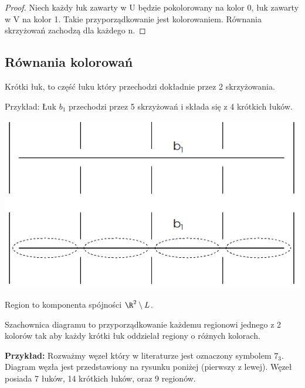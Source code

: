 \begin{proof}
Niech każdy łuk zawarty w U będzie pokolorowany na kolor 0, łuk zawarty w V na kolor 1. Takie przyporządkowanie jest kolorowaniem. Równania skrzyżowań zachodzą dla każdego n. 
\end{proof}


	
\subsection{Równania kolorowań}
\begin{definicja}
Krótki łuk, to część łuku który przechodzi dokładnie przez 2 skrzyżowania. 
\end{definicja}
Przykład: Łuk $b_{1}$ przechodzi przez 5 skrzyżowań i składa się z 4 krótkich łuków. \\

\begin{center}
			\includegraphics[scale=0.2]{2/Obrazy/ShortArc} \\
\end{center}

\begin{definicja}
Region to komponenta spójności $\R^{2} \setminus L$.
\end{definicja}
\begin{definicja}
Szachownica diagramu to przyporządkowanie każdemu regionowi jednego z 2 kolorów tak aby każdy krótki łuk oddzielał regiony o różnych kolorach.
\end{definicja}

\textbf{Przykład:} Rozważmy węzeł który w literaturze jest oznaczony symbolem $7_{3}$. Diagram węzła jest przedstawiony na rysunku poniżej (pierwszy z lewej). Węzeł posiada 7 łuków, 14 krótkich łuków, oraz 9 regionów.

